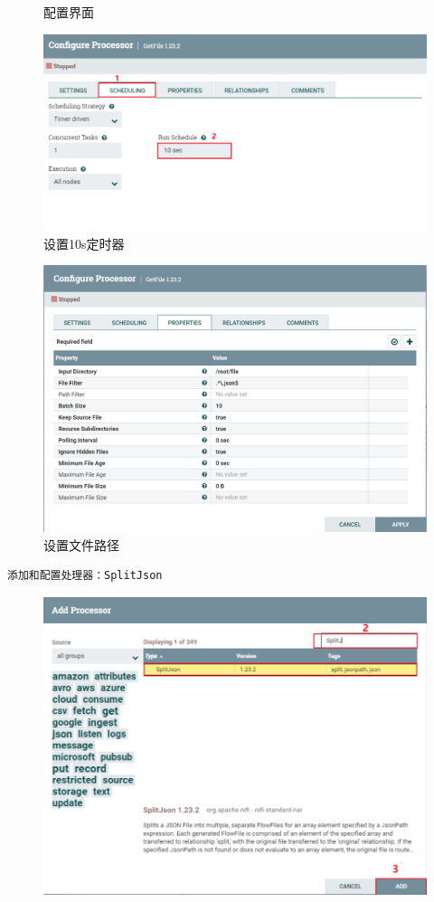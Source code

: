 \documentclass{article}
\begin{document}
\begin{enumerate}
\begin{figure}[htp]
        \caption{配置界面}
        \label{pic6}
    \end{figure}
    \begin{figure}[htp]
        \centering
        \includegraphics[width=13cm]{定时器10s.png}
        \caption{设置10s定时器}
        \label{pic6}
    \end{figure}
    \begin{figure}[htp]
        \centering
        \includegraphics[width=13cm]{getfile配置2.png}
        \caption{设置文件路径}
        \label{pic6}
    \end{figure}
    \newpage
    \begin{lstlisting}
添加和配置处理器：SplitJson
    \end{lstlisting}
    \begin{figure}[htp]
        \centering
        \includegraphics[width=13cm]{添加split.png}

\end{figure}
\end{enumerate}
\end{document}
